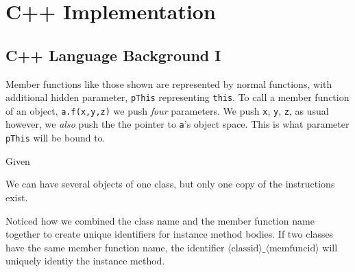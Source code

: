 
\chapter{C++ Implementation}





\section{C++ Language Background I}





Member functions like those shown are represented by normal functions, 
with additional hidden parameter, \lstinline{pThis} representing \lstinline{this}. 
To call a member function of an object, \lstinline{a.f(x,y,z)} we push 
\textit{four} parameters. We push \lstinline{x}, \lstinline{y}, \lstinline{z}, 
as usual however, we \textit{also} push the the pointer to \lstinline{a}'s object space. 
This is what parameter \lstinline{pThis} will be bound to.

Given


We can have several objects of one class, but only one copy of the instructions exist.

\begin{figure}[h]
\end{figure} 


Noticed how we combined the class name and the member function name together 
to create unique identifiers for instance method bodies. 
If two classes have the same member function name, the identifier 
$\langle \text{classid} \rangle \_ \langle \text{memfuncid} \rangle$
will uniquely identiy the instance method. 

